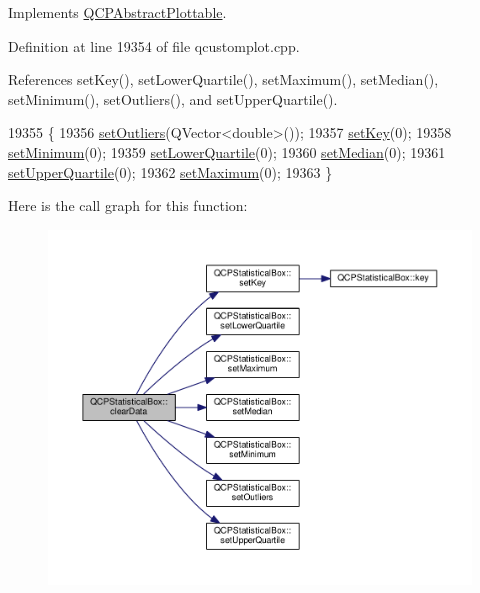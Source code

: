Implements \hyperlink{class_q_c_p_abstract_plottable_a86e5b8fd4b6ff4f4084e7ea4c573fc53}{Q\+C\+P\+Abstract\+Plottable}.



Definition at line 19354 of file qcustomplot.\+cpp.



References set\+Key(), set\+Lower\+Quartile(), set\+Maximum(), set\+Median(), set\+Minimum(), set\+Outliers(), and set\+Upper\+Quartile().


\begin{DoxyCode}
19355 \{
19356   \hyperlink{class_q_c_p_statistical_box_af9bc09620e0bf93bf444ee35e5800d1d}{setOutliers}(QVector<double>());
19357   \hyperlink{class_q_c_p_statistical_box_a84a1c6d34b2f9af40bca0c527d51e97e}{setKey}(0);
19358   \hyperlink{class_q_c_p_statistical_box_a84ff7cc61ba44890f0c3e0c99c19941e}{setMinimum}(0);
19359   \hyperlink{class_q_c_p_statistical_box_a680941af5e23d902013962fa67223f9e}{setLowerQuartile}(0);
19360   \hyperlink{class_q_c_p_statistical_box_a65970e77a897da4ecb4b15300868aad3}{setMedian}(0);
19361   \hyperlink{class_q_c_p_statistical_box_a65a1375f941c5a2077b5201229e89346}{setUpperQuartile}(0);
19362   \hyperlink{class_q_c_p_statistical_box_acec5ad1901f00f2c5387cfb4d9787eb3}{setMaximum}(0);
19363 \}
\end{DoxyCode}


Here is the call graph for this function\+:\nopagebreak
\begin{figure}[H]
\begin{center}
\leavevmode
\includegraphics[width=350pt]{class_q_c_p_statistical_box_a19112994449df0c20287858436cc68e3_cgraph}
\end{center}
\end{figure}


